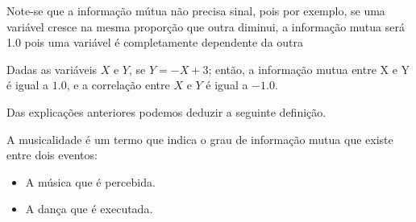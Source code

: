 Note-se que a informação mútua não precisa sinal, pois por exemplo,
se uma variável cresce na mesma proporção que outra diminui, 
a informação mutua será 1.0 pois uma variável é completamente dependente da outra
\begin{example}
Dadas as variáveis  $X$ e $Y$, se $Y=-X+3$; então,
a informação mutua entre X e Y é igual a $1.0$, e
a correlação entre $X$ e $Y$ é igual a $-1.0$.
\end{example}

Das explicações anteriores podemos deduzir a seguinte definição.
\begin{definition} 
\label{def:MusicalidadeNaDancaIT}
A musicalidade é um termo que indica o grau de informação mutua que existe entre dois eventos: 
\begin{itemize}
\item A música que é percebida.
\item A dança que é executada.
\end{itemize} 
\end{definition}
